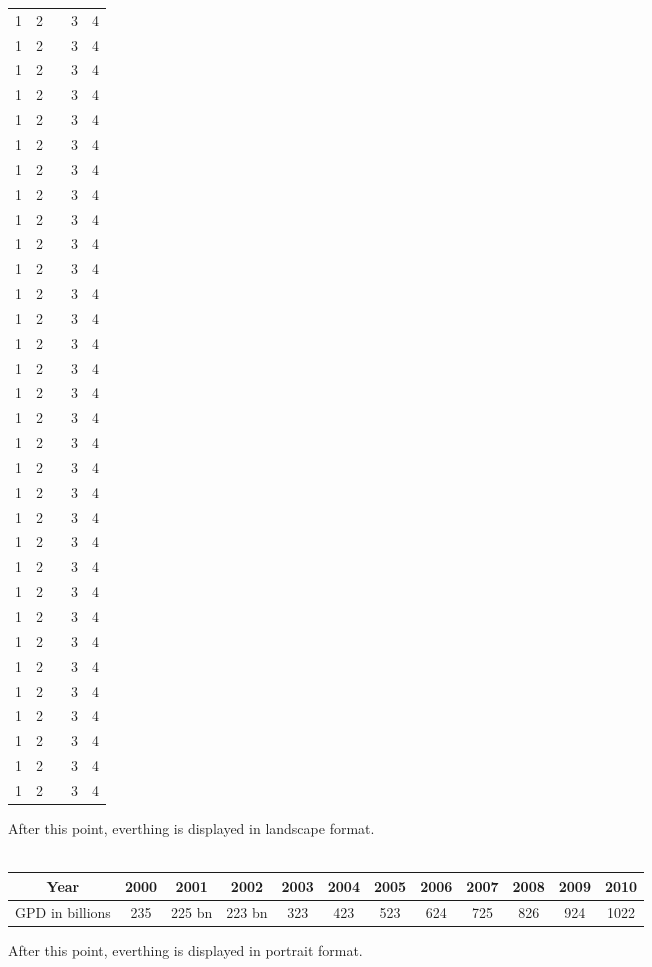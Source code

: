 \documentclass[a4paper,12pt,UTF8,openright]{book}
\begin{document}
\begin{longtable}{p{}p{}||p{}p{}p{}}
1 & 2 & &3 & 4 \\ 1 & 2 && 3 & 4 \\ 1 & 2 && 3 & 4 \\ 1 & 2 && 3 & 4 \\
1 & 2 & &3 & 4 \\ 1 & 2 && 3 & 4 \\ 1 & 2 && 3 & 4 \\ 1 & 2 && 3 & 4 \\
1 & 2 & &3 & 4 \\ 1 & 2 && 3 & 4 \\ 1 & 2 && 3 & 4 \\ 1 & 2& & 3 & 4 \\
1 & 2 & &3 & 4 \\ 1 & 2 && 3 & 4 \\ 1 & 2 && 3 & 4 \\ 1 & 2 && 3 & 4 \\
1 & 2 & &3 & 4 \\ 1 & 2 && 3 & 4 \\ 1 & 2 && 3 & 4 \\ 1 & 2 && 3 & 4 \\
1 & 2 & &3 & 4 \\ 1 & 2 && 3 & 4 \\ 1 & 2 && 3 & 4 \\ 1 & 2& & 3 & 4 \\
1 & 2 & &3 & 4 \\ 1 & 2 && 3 & 4 \\ 1 & 2 && 3 & 4 \\ 1 & 2 && 3 & 4 \\
1 & 2 & &3 & 4 \\ 1 & 2 && 3 & 4 \\ 1 & 2 && 3 & 4 \\ 1 & 2 && 3 & 4 \\
\end{longtable}	

\begin{landscape}
	After this point, everthing is displayed in landscape format.\\
	\ \\
	\begin{tabular}{|c|c|c|c|c|c|c|c|c|c|c|c|}
		\hline
		Year & 2000 & 2001 & 2002 & 2003 & 2004 & 2005 & 2006 & 2007 & 2008 & 2009 & 2010 \\
		\hline 
		GPD in billions & 235  &  225 bn & 223 bn & 323 & 423  & 523 & 624 & 725 & 826  & 924  & 1022  \\
		\hline 
	\end{tabular}
\end{landscape}
After this point, everthing is displayed in portrait format.
	
\end{document}
